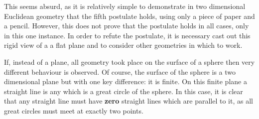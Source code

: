 This seems absurd, as it is relatively simple to demonstrate in two dimensional Euclidean geometry that the fifth postulate holds, using only a piece of paper and a pencil. However, this does not prove that the postulate holds in all cases, only in this one instance. In order to refute the postulate, it is necessary cast out this rigid view of a a flat plane and to consider other geometries in which to work. 

If, instead of a plane, all geometry took place on the surface of a sphere then very different behaviour is observed. Of course, the surface of the sphere is a two dimensional plane but with one key difference: it is finite. On this finite plane a straight line is any which is a great circle of the sphere. In this case, it is clear that any straight line must have \textbf{zero} straight lines which are parallel to it, as all great circles must meet at exactly two points. 